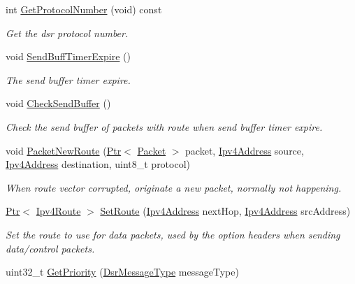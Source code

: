 \begin{DoxyCompactItemize}
int \hyperlink{classns3_1_1dsr_1_1DsrRouting_a3e98f8b73e3020a96dffa8b9ddfc520b}{Get\+Protocol\+Number} (void) const 
\begin{DoxyCompactList}\small\item\em Get the dsr protocol number. \end{DoxyCompactList}\item 
void \hyperlink{classns3_1_1dsr_1_1DsrRouting_a10273aec775b5cf12eafb03ee46c4397}{Send\+Buff\+Timer\+Expire} ()
\begin{DoxyCompactList}\small\item\em The send buffer timer expire. \end{DoxyCompactList}\item 
void \hyperlink{classns3_1_1dsr_1_1DsrRouting_a03ace9023e9fe58434dc004123c7d9e0}{Check\+Send\+Buffer} ()
\begin{DoxyCompactList}\small\item\em Check the send buffer of packets with route when send buffer timer expire. \end{DoxyCompactList}\item 
void \hyperlink{classns3_1_1dsr_1_1DsrRouting_ae70ab39db551d1d81afc081196f78017}{Packet\+New\+Route} (\hyperlink{classns3_1_1Ptr}{Ptr}$<$ \hyperlink{classns3_1_1Packet}{Packet} $>$ packet, \hyperlink{classns3_1_1Ipv4Address}{Ipv4\+Address} source, \hyperlink{classns3_1_1Ipv4Address}{Ipv4\+Address} destination, uint8\+\_\+t protocol)
\begin{DoxyCompactList}\small\item\em When route vector corrupted, originate a new packet, normally not happening. \end{DoxyCompactList}\item 
\hyperlink{classns3_1_1Ptr}{Ptr}$<$ \hyperlink{classns3_1_1Ipv4Route}{Ipv4\+Route} $>$ \hyperlink{classns3_1_1dsr_1_1DsrRouting_a8a726fb52558a1a8172a5bd5b8cdb072}{Set\+Route} (\hyperlink{classns3_1_1Ipv4Address}{Ipv4\+Address} next\+Hop, \hyperlink{classns3_1_1Ipv4Address}{Ipv4\+Address} src\+Address)
\begin{DoxyCompactList}\small\item\em Set the route to use for data packets, used by the option headers when sending data/control packets. \end{DoxyCompactList}\item 
uint32\+\_\+t \hyperlink{classns3_1_1dsr_1_1DsrRouting_a67d111b0188b6e2210d1b4782820f8e3}{Get\+Priority} (\hyperlink{namespacens3_1_1dsr_a7c80bcec67d78dc149a0e503014d07c5}{Dsr\+Message\+Type} message\+Type)

\end{DoxyCompactItemize}
